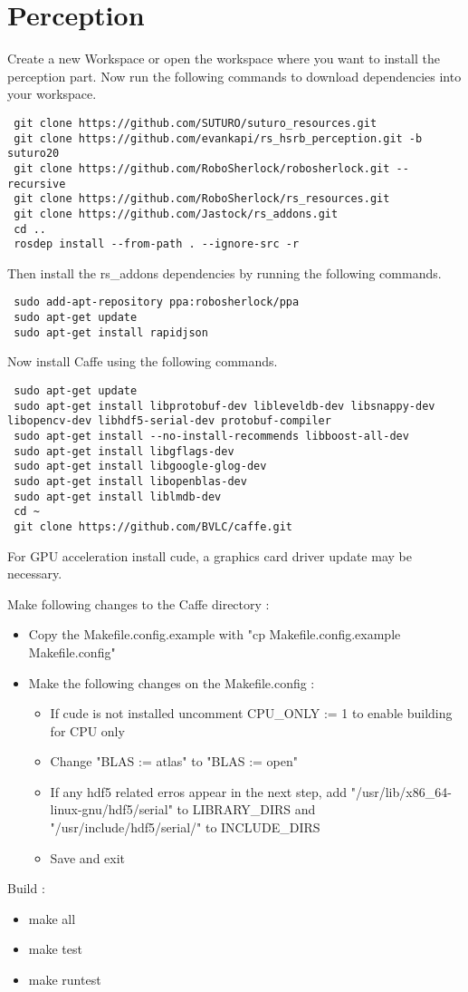 \documentclass[main.tex]{subfiles}
\begin{document}
 \section{Perception}
 Create a new Workspace or open the workspace where you want to install the perception part. Now run the following commands to download dependencies into your workspace.
 
 \begin{lstlisting}
 git clone https://github.com/SUTURO/suturo_resources.git 
 git clone https://github.com/evankapi/rs_hsrb_perception.git -b suturo20
 git clone https://github.com/RoboSherlock/robosherlock.git --recursive
 git clone https://github.com/RoboSherlock/rs_resources.git
 git clone https://github.com/Jastock/rs_addons.git
 cd ..
 rosdep install --from-path . --ignore-src -r \end{lstlisting}
 
 Then install the rs\_addons dependencies by running the following commands.
 \begin{lstlisting}
 sudo add-apt-repository ppa:robosherlock/ppa
 sudo apt-get update
 sudo apt-get install rapidjson \end{lstlisting}
 
 Now install Caffe using the following commands.
 \begin{lstlisting}
 sudo apt-get update
 sudo apt-get install libprotobuf-dev libleveldb-dev libsnappy-dev libopencv-dev libhdf5-serial-dev protobuf-compiler
 sudo apt-get install --no-install-recommends libboost-all-dev
 sudo apt-get install libgflags-dev
 sudo apt-get install libgoogle-glog-dev
 sudo apt-get install libopenblas-dev
 sudo apt-get install liblmdb-dev
 cd ~
 git clone https://github.com/BVLC/caffe.git \end{lstlisting}
 
 For GPU acceleration install cude, a graphics card driver update may be necessary.
 
 Make following changes to the Caffe directory : 
 \begin{itemize}
 \item Copy the Makefile.config.example with "cp Makefile.config.example Makefile.config"
 \item Make the following changes on the Makefile.config :
 	\begin{itemize}
 	\item If cude is not installed uncomment CPU\_ONLY := 1 to enable building for CPU only
 	\item Change "BLAS := atlas" to "BLAS := open"
 	\item If any hdf5 related erros appear in the next step, add "/usr/lib/x86\_64-linux-gnu/hdf5/serial" to LIBRARY\_DIRS and "/usr/include/hdf5/serial/" to INCLUDE\_DIRS
 	\item Save and exit
 	\end{itemize}
 	
 \end{itemize}
 Build :
 \begin{itemize}
 \item make all
 \item make test
 \item make runtest
 \end{itemize}
 
\end{document}

